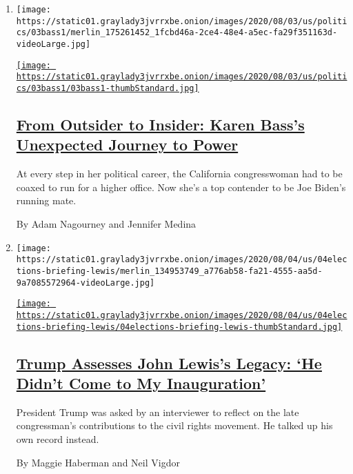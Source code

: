 \begin{enumerate}
\def\labelenumi{\arabic{enumi}.}
\item
  \texttt{[image: https://static01.graylady3jvrrxbe.onion/images/2020/08/03/us/politics/03bass1/merlin\_175261452\_1fcbd46a-2ce4-48e4-a5ec-fa29f351163d-videoLarge.jpg]}

  \href{/2020/08/04/us/politics/karen-bass-vice-president-biden.html}{\texttt{[image: https://static01.graylady3jvrrxbe.onion/images/2020/08/03/us/politics/03bass1/03bass1-thumbStandard.jpg]}}

  \hypertarget{from-outsider-to-insider-karen-basss-unexpected-journey-to-power}{%
  \subsection{\texorpdfstring{\href{/2020/08/04/us/politics/karen-bass-vice-president-biden.html}{From
  Outsider to Insider: Karen Bass's Unexpected Journey to
  Power}}{From Outsider to Insider: Karen Bass's Unexpected Journey to Power}}\label{from-outsider-to-insider-karen-basss-unexpected-journey-to-power}}

  At every step in her political career, the California congresswoman
  had to be coaxed to run for a higher office. Now she's a top contender
  to be Joe Biden's running mate.

  By Adam Nagourney and Jennifer Medina
\item
  \texttt{[image: https://static01.graylady3jvrrxbe.onion/images/2020/08/04/us/04elections-briefing-lewis/merlin\_134953749\_a776ab58-fa21-4555-aa5d-9a7085572964-videoLarge.jpg]}

  \href{/2020/08/04/us/politics/trump-john-lewis-axios.html}{\texttt{[image: https://static01.graylady3jvrrxbe.onion/images/2020/08/04/us/04elections-briefing-lewis/04elections-briefing-lewis-thumbStandard.jpg]}}

  \hypertarget{trump-assesses-john-lewiss-legacy-he-didnt-come-to-my-inauguration}{%
  \subsection{\texorpdfstring{\href{/2020/08/04/us/politics/trump-john-lewis-axios.html}{Trump
  Assesses John Lewis's Legacy: `He Didn't Come to My
  Inauguration'}}{Trump Assesses John Lewis's Legacy: `He Didn't Come to My Inauguration'}}\label{trump-assesses-john-lewiss-legacy-he-didnt-come-to-my-inauguration}}

  President Trump was asked by an interviewer to reflect on the late
  congressman's contributions to the civil rights movement. He talked up
  his own record instead.

  By Maggie Haberman and Neil Vigdor
\end{enumerate}

